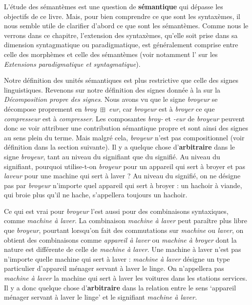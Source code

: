 L’étude des sémantèmes est une question de \textbf{sémantique} qui dépasse les objectifs de ce livre. Mais, pour bien comprendre ce que sont les syntaxèmes, il nous semble utile de clarifier d’abord ce que sont les sémantèmes. Comme nous le verrons dans ce chapitre, l’extension des syntaxèmes, qu’elle soit prise dans sa dimension syntagmatique ou paradigmatique, est généralement comprise entre celle des morphèmes et celle des sémantèmes (voir notamment l’ sur les \textit{Extensions paradigmatique et syntagmatique}).

Notre définition des unités sémantiques est plus restrictive que celle des signes linguistiques. Revenons sur notre définition des signes donnée à la  sur la \textit{Décomposition propre des signes}. Nous avons vu que le signe \textit{broyeur} se décompose proprement en \textit{broy~}${\boxplus}$\textit{~eur}, car \textit{broyeur} est à \textit{broyer} ce que \textit{compresseur} est à \textit{compresser}. Les composantes \textit{broy-} et \textit{{}-eur} de \textit{broyeur} peuvent donc se voir attribuer une contribution sémantique propre et sont ainsi des signes au sens plein du terme. Mais malgré cela, \textit{broyeur} n’est pas compositionnel (voir définition dans la section suivante). Il y a quelque chose d’\textbf{arbitraire} dans le signe \textit{broyeur}, tant au niveau du signifiant que du signifié. Au niveau du signifiant, pourquoi utilise-t-on \textit{broyeur} pour un appareil qui sert à broyer et pas \textit{laveur} pour une machine qui sert à laver ? Au niveau du signifié, on ne désigne pas par \textit{broyeur} n’importe quel appareil qui sert à broyer : un hachoir à viande, qui broie plus qu’il ne hache, s’appellera toujours un hachoir.

Ce qui est vrai pour \textit{broyeur} l’est aussi pour des combinaisons syntaxiques, comme \textit{machine à laver}. La combinaison \textit{machine à laver} peut paraître plus libre que \textit{broyeur}, pourtant lorsqu’on fait des commutations sur \textit{machine} ou \textit{laver}, on obtient des combinaisons comme \textit{appareil à laver} ou \textit{machine à broyer} dont la nature est différente de celle de \textit{machine à laver}. Une machine à laver n’est pas n’importe quelle machine qui sert à laver : \textit{machine à laver} désigne un type particulier d’appareil ménager servant à laver le linge. On n’appellera pas \textit{machine à laver} la machine qui sert à laver les voitures dans les stations services. Il y a donc quelque chose d’\textbf{arbitraire} dans la relation entre le sens ‘appareil ménager servant à laver le linge’ et le signifiant \textit{machine à laver.}


